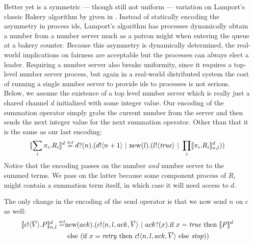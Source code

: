 Better yet is a symmetric --- though still not uniform --- variation on Lamport's classic Bakery algorithm \cite{lamp74} by given in \cite{nestm00}.
Instead of statically encoding the asymmetry in process ids, Lamport's algorithm has processes dynamically obtain a number from a number server much as a patron might when entering the queue at a bakery counter.
Because this asymmetry is dynamically determined, the real-world implications on fairness are acceptable but the processes can always elect a leader.
Requiring a number server also breaks uniformity, since it requires a top-level number server process, but again in a real-world distributed system the cost of running a single number server to provide ids to processes is not serious.  
Below, we assume the existence of a top level number server which is really just a shared channel $d$ initialized with some integer value.  
Our encoding of the summation operator simply grabs the current number from the server and then sends the next integer value for the next summation operator.  
Other than that it is the same as our last encoding:
\[
	\llbracket{\displaystyle\sum_{i} \pi_i.R_i}\rrbracket^d \overset{\mbox{\tiny{def}}}{=} {d}?({n}).({d}!\langle{n+1}\rangle \ |\  \text{new}({l}).({l}!\langle{ \ensuremath{\text{\emph{true}}} }\rangle \ |\  \displaystyle\prod_{i}\llbracket{\pi_i.R_i}\rrbracket^d_{n,l}))
\]
Notice that the encoding passes on the number \emph{and} number server to the summed terms.  
We pass on the latter because some component process of $R_i$ might contain a summation term itself, in which case it will need access to $d$.

The only change in the encoding of the send operator is that we now send $n$ on $c$ as well:
\begin{equation*}\begin{split}
	\llbracket{ \ensuremath{{c}!\langle{ \ensuremath{\overline{V}} }\rangle.} P}\rrbracket^d_{n,l} \overset{\mbox{\tiny{def}}}{=} & \text{new}({ack}).({c}!\langle{n,l,ack, \ensuremath{\overline{V}} }\rangle \ |\  {ack}?({x}). \text{if } {x= \ensuremath{\text{\emph{true}}} } \text{ then } \llbracket{P}\rrbracket^d \\
	&\text{ else } (\text{if } {x= \ensuremath{\text{\emph{retry}}} } \text{ then } {c}!\langle{n,l,ack, \ensuremath{\overline{V}} }\rangle \text{ else } \mbox{\emph{stop}}))
\end{split}\end{equation*}

